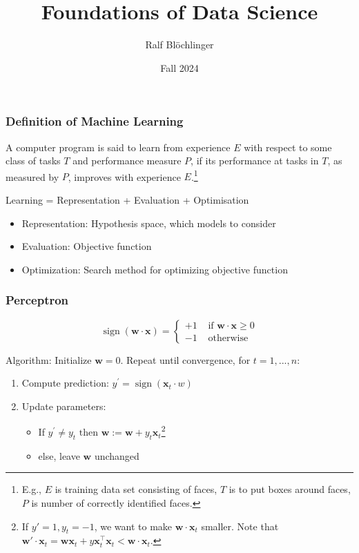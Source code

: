 \documentclass[11pt, %
	oneside, %
	english, %
	onehalfspacing, %
	parskip, %
	]{article} %
\title{\Huge{Foundations of Data Science}}
\author{Ralf Blöchlinger}
\date{Fall 2024}
\theoremstyle{definition}
\begin{document}
\maketitle

\tableofcontents

\newpage




\subsubsection*{Definition of Machine Learning}

A computer program is said to learn from experience $E$ with respect to some class of tasks $T$ and performance measure $P$, if its performance at tasks in $T$, as measured by $P$, improves with experience $E$.\footnote{E.g., $E$ is training data set consisting of faces, $T$ is to put boxes around faces, $P$ is number of correctly identified faces.}

\begin{center}
	Learning = Representation + Evaluation + Optimisation
\end{center}
\begin{itemize}
	\item Representation: Hypothesis space, which models to consider
	\item Evaluation: Objective function
	\item Optimization: Search method for optimizing objective function
\end{itemize}

\subsubsection*{Perceptron}
\begin{equation*}
	\operatorname{sign}(\boldsymbol{w} \cdot \mathbf{x})= \begin{cases}+1 & \text { if } \boldsymbol{w} \cdot \mathbf{x} \geq 0 \\ -1 & \text { otherwise }\end{cases}
\end{equation*}

Algorithm: Initialize $\mathbf{w} = 0$. Repeat until convergence, for $t = 1, ..., n$:
\begin{enumerate}
	\item Compute prediction: $y^{\prime}=\operatorname{sign}\left(\mathbf{x}_t \cdot w\right)$
	\item Update parameters:
	\begin{itemize}
		\item If $y^{\prime} \neq y_t \text { then } \mathbf{w}:=\mathbf{w}+y_t \mathbf{x}_t$\footnote{If $y' = 1, y_t = -1$, we want to make $\mathbf{w} \cdot \mathbf{x}_t$ smaller. Note that $\mathbf{w'} \cdot \mathbf{x}_t = \mathbf{w} \mathbf{x}_t + y  \mathbf{x}_t^\top  \mathbf{x}_t < \mathbf{w} \cdot  \mathbf{x}_t$.}
		\item else, leave $\mathbf{w}$ unchanged
	\end{itemize}
\end{enumerate}
\end{document}
